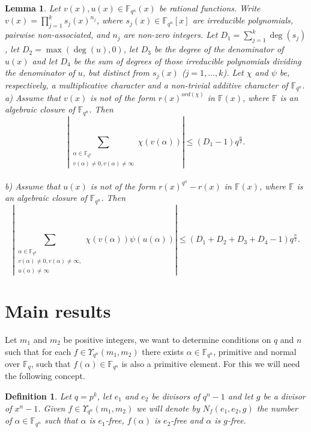 \documentclass[12pt]{article}
\newtheorem{lemma}[theorem]{Lemma}
\newtheorem{defin}[theorem]{Definition}
\newenvironment{definition}{\begin{defin}\em}{\end{defin}}
\newcommand{\F}{\mathbb{F}}
\begin{document}
\begin{lemma} \label{lema cota}
Let $v(x),u(x) \in \F_{q^n}(x)$ be rational functions. Write
	$v(x)=\prod_{j=1}^k s_j(x)^{n_j}$, where
	$s_j(x) \in \F_{q^n}[x]$ are irreducible polynomials, pairwise 
	non-associated,  and
	$n_j$ are non-zero integers. Let $D_1=\sum_{j=1}^k \deg (s_j)$,
	let $D_2=\max (\deg (u), 0)$, let $D_3$ be the degree of the denominator of 
	$u(x)$
	and let $D_4$ be the sum of degrees of those irreducible polynomials 
	dividing the denominator of $u$,
	but distinct from $s_j(x)$ ($j=1,\ldots, k$). Let $\chi$ and $\psi$ be, 
	respectively, a multiplicative character and 
	a non-trivial additive character of $\F_{q^n}$.\\
a) Assume that $v(x)$ is not of the form $r(x)^{ord(\chi)}$
	in $\mathbb{F}(x)$, where $\mathbb{F}$ is an algebraic closure of 
	$\mathbb{F}_{q^n}$. Then 
$$
	\displaystyle \left|
	\sum_{\substack{\alpha \in \mathbb{F}_{q^n}  \\ v(\alpha)\neq 0 , 
	v(\alpha)\neq
			\infty}} \chi(v(\alpha)) \right|
	\leq
	(D_1-1 ) q^{\frac{n}{2}}.
$$\\
b) Assume that
	$u(x)$ is not of the form $r(x)^{q^n}-r(x)$ in $\F(x)$, where $\mathbb{F}$ 
	is an algebraic closure of $\mathbb{F}_{q^n}$. Then
$$
	\displaystyle \left|
	\sum_{\substack{\alpha \in \mathbb{F}_{q^n}  \\ v(\alpha)\neq 0, 
	v(\alpha)\neq \infty , \\
	u(\alpha)\neq \infty}} \chi(v(\alpha)) \psi(u(\alpha)) \right|
	\leq
	\left( D_1 + D_2 + D_3 + D_4 - 1  \right) q^{\frac{n}{2}}.
$$	
\end{lemma}	


\section{Main results}\label{section-main}

Let $m_1$ and $m_2$ be positive integers, we want to determine 
conditions on $q$ and $n$ such that
for each $f \in \Upsilon_{q^n} (m_1,m_2)$
there exists $\alpha \in \mathbb{F}_{q^n}$, primitive and normal
over $\mathbb{F}_q$, such that $f(\alpha) \in \mathbb{F}_{q^n}$  is also a 
primitive element.	
For this we will need the following concept.
\begin{definition} 	\label{upsilon}
Let $q=p^k$, let
$e_1$ and $e_2$ be divisors of $q^n-1$ and let $g$ be a divisor of $x^n-1$.
Given $f \in \Upsilon_{q^n}(m_1,m_2)$
we will denote by $N_{f}(e_1,e_2,g)$ the number of $\alpha \in \F_{q^n}$ such that
$\alpha$ is $e_1$-free, $f(\alpha)$ is $e_2$-free and
$\alpha$ is $g$-free.
\end{definition}
\end{document}
